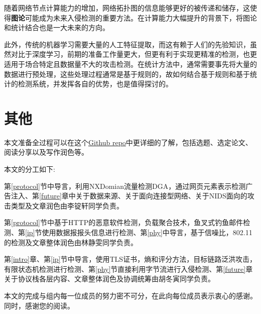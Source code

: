 \documentclass[12pt]{article} %
\begin{document}
随着网络节点计算能力的增加，网络拓扑图的信息能够更好的被传递和储存，这使得\textbf{图论}可能成为未来入侵检测的重要方法。在计算能力大幅提升的背景下，将图论和统计结合也是一大未来的方向。

此外，传统的机器学习需要大量的人工特征提取，而这有赖于人们的先验知识，虽然对比于深度学习，前期的准备工作量更大，但更有利于实现更精准的检测，也更适用于场合特定且数据量不大的攻击检测。在统计方法中，通常需要事先将大量的数据进行预处理，这些处理过程通常是基于规则的，故如何结合基于规则和基于统计的检测系统，并发挥各自的优势，也是值得探讨的。
\section{其他}
\label{other}

本文准备全过程可以在这个\href{https://github.com/Voivio/Network-Security-Protocol-project}{Github repo}中更详细的了解，包括选题、选定论文、阅读分享以及写作润色等。

本文的分工如下:

第\ref{protocol}节中导言，利用NXDomian流量检测DGA，通过网页元素表示检测广告注入、第\ref{future}章中关于数据来源、关于面向连接型网络、关于NIDS面向的攻击类型及文章润色由李锭轩同学负责。

第\ref{protocol}节中基于HTTP的恶意软件检测，负载聚合技术，鱼叉式钓鱼邮件检测、第\ref{ip}节使用数据报报头信息进行检测、第\ref{phy}中导言，基于信噪比，802.11的检测及文章整体润色由林静雯同学负责。

第\ref{intro}章、第\ref{ip}节中导言，使用TLS证书，熵和评分方法，目标链路泛洪攻击，有限状态机检测进行检测、第\ref{phy}节直接利用字节流进行入侵检测、第\ref{future}章关于协议栈各层内容、文章整体润色及协调统筹由胡冬寅同学负责。

本文的完成与组内每一位成员的努力密不可分，在此向每位成员表示衷心的感谢。同时，感谢您的阅读。
\end{document}

